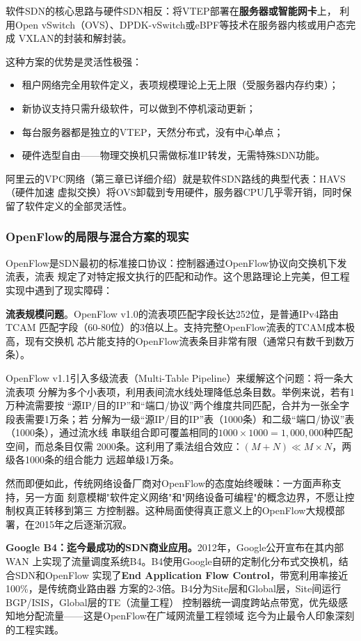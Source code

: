 软件SDN的核心思路与硬件SDN相反：将VTEP部署在\textbf{服务器或智能网卡}上，
利用Open vSwitch（OVS）、DPDK-vSwitch或eBPF等技术在服务器内核或用户态完成
VXLAN的封装和解封装。

这种方案的优势是灵活性极强：
\begin{itemize}
  \item 租户网络完全用软件定义，表项规模理论上无上限（受服务器内存约束）；
  \item 新协议支持只需升级软件，可以做到不停机滚动更新；
  \item 每台服务器都是独立的VTEP，天然分布式，没有中心单点；
  \item 硬件选型自由——物理交换机只需做标准IP转发，无需特殊SDN功能。
\end{itemize}

阿里云的VPC网络（第三章已详细介绍）就是软件SDN路线的典型代表：HAVS（硬件加速
虚拟交换）将OVS卸载到专用硬件，服务器CPU几乎零开销，同时保留了软件定义的全部灵活性。

\subsubsection{OpenFlow的局限与混合方案的现实}

OpenFlow是SDN最初的标准接口协议：控制器通过OpenFlow协议向交换机下发流表，流表
规定了对特定报文执行的匹配和动作。这个思路理论上完美，但工程实现中遇到了现实障碍：

\textbf{流表规模问题}。OpenFlow v1.0的流表项匹配字段长达252位，是普通IPv4路由TCAM
匹配字段（60-80位）的3倍以上。支持完整OpenFlow流表的TCAM成本极高，现有交换机
芯片能支持的OpenFlow流表条目非常有限（通常只有数千到数万条）。

OpenFlow v1.1引入多级流表（Multi-Table Pipeline）来缓解这个问题：将一条大流表项
分解为多个小表项，利用表间流水线处理降低总条目数。举例来说，若有1万种流需要按
``源IP/目的IP''和``端口/协议''两个维度共同匹配，合并为一张全字段表需要1万条；若
分解为一级``源IP/目的IP''表（1000条）和二级``端口/协议''表（1000条），通过流水线
串联组合即可覆盖相同的$1000 \times 1000 = 1,000,000$种匹配空间，而总条目仅需
2000条。这利用了乘法组合效应：$(M+N) \ll M \times N$，两级各1000条的组合能力
远超单级1万条。

然而即便如此，传统网络设备厂商对OpenFlow的态度始终暧昧：一方面声称支持，另一方面
刻意模糊"软件定义网络"和"网络设备可编程"的概念边界，不愿让控制权真正转移到第三
方控制器。这种局面使得真正意义上的OpenFlow大规模部署，在2015年之后逐渐沉寂。

\textbf{Google B4：迄今最成功的SDN商业应用。}2012年，Google公开宣布在其内部WAN
上实现了流量调度系统B4。B4使用Google自研的定制化分布式交换机，结合SDN和OpenFlow
实现了\textbf{End Application Flow Control}，带宽利用率接近100\%，是传统商业路由器
方案的2-3倍。B4分为Site层和Global层，Site间运行BGP/ISIS，Global层的TE（流量工程）
控制器统一调度跨站点带宽，优先级感知地分配流量——这是OpenFlow在广域网流量工程领域
迄今为止最令人印象深刻的工程实践。

